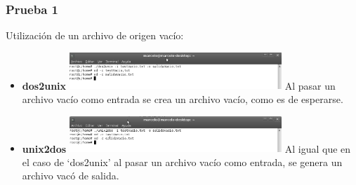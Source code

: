 \documentclass[a4paper,10pt]{article}
\begin{document}
    \subsubsection{Prueba 1}
    Utilizaci\'on de un archivo de origen vac\'io:
      \begin{itemize}
      \item \textbf{dos2unix}
      \newline
      \includegraphics[width=8cm, viewport=0 0 896 156]{../Informe/Imagenes/prueba1-archivo-dos2unix.png}
      \newline	
      Al pasar un archivo vac\'io como entrada se crea un archivo vac\'io, como es de esperarse.
      \item \textbf{unix2dos}
      \newline
      \includegraphics[width=8cm, viewport=0 0 898 153]{../Informe/Imagenes/prueba1-archivo-unix2dos.png}	
      \newline
      Al igual que en el caso de `dos2unix' al pasar un archivo vac\'io como entrada, se genera un archivo vac\'o de salida.
      
      \end{itemize}
\end{document}
